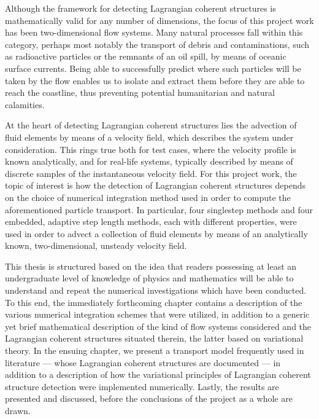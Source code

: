 Although the framework for detecting Lagrangian coherent structures is
mathematically valid for any number of dimensions, the focus of this project
work has been two-dimensional flow systems. Many natural processes fall
within this category, perhaps most notably the transport of debris and
contaminations, such as radioactive particles or the remnants of an oil
spill, by means of oceanic surface currents. Being able to successfully predict
where such particles will be taken by the flow enables us to isolate and
extract them before they are able to reach the coastline, thus preventing
potential humanitarian and natural calamities.

\newpage

At the heart of detecting Lagrangian coherent structures lies the advection
of fluid elements by means of a velocity field, which describes the system
under consideration. This rings true both for test cases, where the velocity
profile is known analytically, and for real-life systems, typically described
by means of discrete samples of the instantaneous velocity field. For this
project work, the topic of interest is how the detection of Lagrangian coherent
structures depends on the choice of numerical integration method used in order
to compute the aforementioned particle transport. In particular, four singlestep
methods and four embedded, adaptive step length methods, each with different
properties, were used in order to advect a collection of fluid elements
by means of an analytically known, two-dimensional, unsteady velocity field.

This thesis is structured based on the idea that readers possessing
at least an undergraduate level of knowledge of physics and mathematics will be
able to understand and repeat the numerical investigations which have been
conducted. To this end, the immediately forthcoming chapter contains a
description of the various numerical integration schemes that were
utilized, in addition to a generic yet brief mathematical description of
the kind of flow systems considered and the Lagrangian coherent structures
situated therein, the latter based on variational theory. In the ensuing
chapter, we present a transport model frequently used in literature --- whose
Lagrangian coherent structures are documented --- in addition to a description
of how the variational principles of Lagrangian coherent structure detection
were implemented numerically. Lastly, the results are presented and discussed,
before the conclusions of the project as a whole are drawn.


